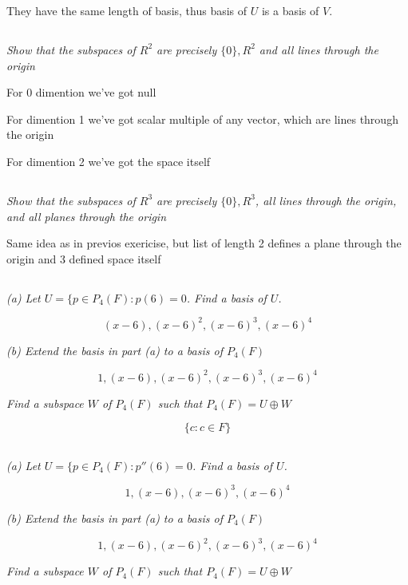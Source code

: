 \documentclass[11pt,oneside,titlepage]{book}
\begin{document}
They have the same length of basis, thus basis of $U$ is a basis of $V$.

\subsection{}
\textit{Show that the subspaces of $R^2$ are precisely $\{0\}, R^2$ and all
  lines through the origin}

For 0 dimention we've got null

For dimention 1 we've got scalar multiple of any vector, which are lines
through the origin

For dimention 2 we've got the space itself

\subsection{}
\textit{Show that the subspaces of $R^3$ are precisely $\{0\}, R^3$, all
  lines through the origin, and all planes through the origin}

Same idea as in previos exericise, but list of length 2 defines a plane
through the origin and 3 defined space itself

\subsection{}
\textit{(a) Let $U = \{p \in P_4(F): p(6) = 0$. Find a basis of $U$.}

$$(x - 6), (x - 6)^2, (x - 6)^3, (x - 6)^4$$

\textit{(b) Extend the basis in part (a) to a basis of $P_4(F)$}

$$1, (x - 6), (x - 6)^2, (x - 6)^3, (x - 6)^4$$

\textit{Find a subspace $W$ of $P_4(F)$ such that $P_4(F) = U \oplus W$}

$$\{c: c \in F\}$$

\subsection{}
\textit{(a) Let $U = \{p \in P_4(F): p''(6) = 0$. Find a basis of $U$.}

$$1, (x - 6), (x - 6)^3, (x - 6)^4$$

\textit{(b) Extend the basis in part (a) to a basis of $P_4(F)$}

$$1, (x - 6), (x - 6)^2, (x - 6)^3, (x - 6)^4$$

\textit{Find a subspace $W$ of $P_4(F)$ such that $P_4(F) = U \oplus W$}
\end{document}
